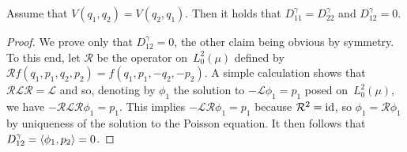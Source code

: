 \documentclass[11pt,a4paper]{article}
\begin{document}
\begin{lemma}
    \label{lemma:diffusion_symmmetry}
    Assume that $V(q_1, q_2) = V(q_2, q_1)$.
    Then it holds that $D^{\gamma}_{11} = D^{\gamma}_{22}$ and $D^{\gamma}_{12} = 0$.
\end{lemma}
\begin{proof}
    We prove only that $D^{\gamma}_{12} = 0$,
    the other claim being obvious by symmetry.
    To this end,
    let $\mathcal R$ be the operator on~$L^2_0(\mu)$ defined by $\mathcal R f(q_1, p_1, q_2, p_2) = f(q_1, p_1, -q_2, -p_2)$.
    A simple calculation shows that~$\mathcal R \mathcal L \mathcal R = \mathcal L$ and so,
    denoting by $\phi_1$ the solution to $- \mathcal L \phi_1 = p_1$ posed on~$L^2_0(\mu)$,
    we have $- \mathcal R \mathcal L \mathcal R \phi_1 = p_1$.
    This implies  $- \mathcal L \mathcal R \phi_1 = p_1$ because $\mathcal R^2 = \operatorname{id}$,
    so $\phi_1 = \mathcal R \phi_1$ by uniqueness of the solution to the Poisson equation.
    It then follows that $D^{\gamma}_{12} = \ip{\phi_1}{p_2} = 0$.
\end{proof}
\end{document}

